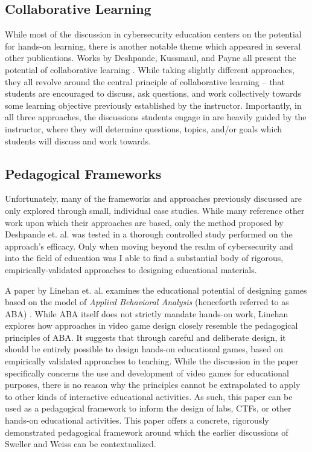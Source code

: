 \documentclass{article}
\begin{document}
\subsection{Collaborative Learning}

    While most of the discussion in cybersecurity education centers on the potential for hands-on learning, there is another notable theme which appeared in several other publications. 
    Works by Deshpande, Kussmaul, and Payne all present the potential of collaborative learning \cite{P-Deshpande,C-Kussmaul,B-Payne}. 
    While taking slightly different approaches, they all revolve around the central principle of collaborative learning -- that students are encouraged to discuss, ask questions, and work collectively towards some learning objective previously established by the instructor. 
    Importantly, in all three approaches, the discussions students engage in are heavily guided by the instructor, where they will determine questions, topics, and/or goals which students will discuss and work towards. 

\subsection{Pedagogical Frameworks}

    Unfortunately, many of the frameworks and approaches previously discussed are only explored through small, individual case studies. 
    While many reference other work upon which their approaches are based, only the method proposed by Deshpande et. al. was tested in a thorough controlled study performed on the approach’s efficacy. 
    Only when moving beyond the realm of cybersecurity and into the field of education was I able to find a substantial body of rigorous, empirically-validated approaches to designing educational materials. 

    A paper by Linehan et. al. examines the educational potential of designing games based on the model of \emph{Applied Behavioral Analysis} (henceforth referred to as ABA) \cite{C-Linehan}. 
    While ABA itself does not strictly mandate hands-on work, Linehan explores how approaches in video game design closely resemble the pedagogical principles of ABA. 
    It suggests that through careful and deliberate design, it should be entirely possible to design hands-on educational games, based on empirically validated approaches to teaching. 
    While the discussion in the paper specifically concerns the use and development of video games for educational purposes, there is no reason why the principles cannot be extrapolated to apply to other kinds of interactive educational activities. 
    As such, this paper can be used as a pedagogical framework to inform the design of labs, CTFs, or other hands-on educational activities. 
    This paper offers a concrete, rigorously demonstrated pedagogical framework around which the earlier discussions of Sweller and Weiss can be contextualized. 
\end{document}
